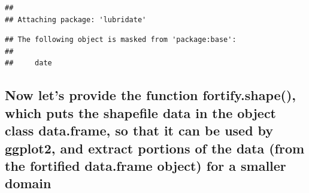 \documentclass[12pt,]{article}
\newenvironment{Shaded}{\begin{snugshade}}{\end{snugshade}}
\newcommand{\ControlFlowTok}[1]{\textcolor[rgb]{0.13,0.29,0.53}{\textbf{#1}}}
\newcommand{\DataTypeTok}[1]{\textcolor[rgb]{0.13,0.29,0.53}{#1}}
\newcommand{\DecValTok}[1]{\textcolor[rgb]{0.00,0.00,0.81}{#1}}
\newcommand{\KeywordTok}[1]{\textcolor[rgb]{0.13,0.29,0.53}{\textbf{#1}}}
\newcommand{\NormalTok}[1]{#1}
\newcommand{\OperatorTok}[1]{\textcolor[rgb]{0.81,0.36,0.00}{\textbf{#1}}}
\newcommand{\StringTok}[1]{\textcolor[rgb]{0.31,0.60,0.02}{#1}}
\begin{document}
\begin{verbatim}
## 
## Attaching package: 'lubridate'
\end{verbatim}

\begin{verbatim}
## The following object is masked from 'package:base':
## 
##     date
\end{verbatim}

\hypertarget{now-lets-provide-the-function-fortify.shape-which-puts-the-shapefile-data-in-the-object-class-data.frame-so-that-it-can-be-used-by-ggplot2-and-extract-portions-of-the-data-from-the-fortified-data.frame-object-for-a-smaller-domain}{%
\subsection{Now let's provide the function fortify.shape(), which puts
the shapefile data in the object class data.frame, so that it can be
used by ggplot2, and extract portions of the data (from the fortified
data.frame object) for a smaller
domain}\label{now-lets-provide-the-function-fortify.shape-which-puts-the-shapefile-data-in-the-object-class-data.frame-so-that-it-can-be-used-by-ggplot2-and-extract-portions-of-the-data-from-the-fortified-data.frame-object-for-a-smaller-domain}}

\begin{Shaded}
\end{Shaded}
\end{document}
